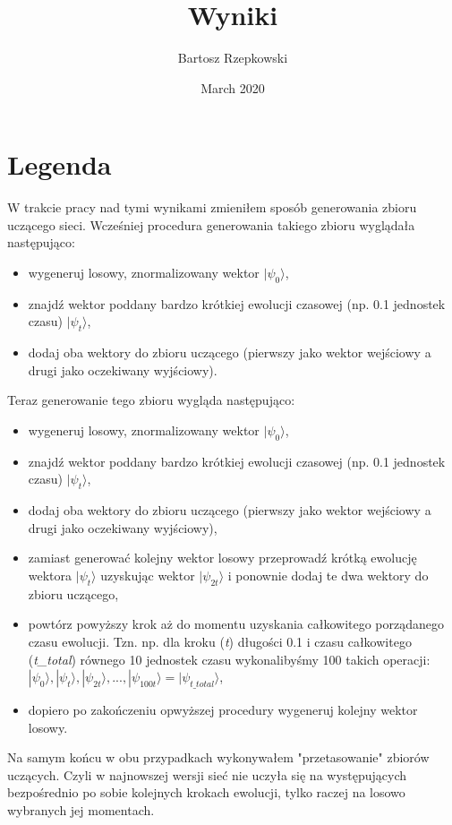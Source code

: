 \documentclass{article}
\title{Wyniki}
\author{Bartosz Rzepkowski}
\date{March 2020}
\begin{document}
\maketitle

\section*{Legenda}

W trakcie pracy nad tymi wynikami zmieniłem sposób generowania zbioru uczącego sieci. Wcześniej procedura generowania takiego zbioru wyglądała następująco:
\begin{itemize}
	\item wygeneruj losowy, znormalizowany wektor $|\psi_0\rangle$,
	\item znajdź wektor poddany bardzo krótkiej ewolucji czasowej (np. 0.1 jednostek czasu) $|\psi_t\rangle$,
	\item dodaj oba wektory do zbioru uczącego (pierwszy jako wektor wejściowy a drugi jako oczekiwany wyjściowy).
\end{itemize}

Teraz generowanie tego zbioru wygląda następująco:
\begin{itemize}
	\item wygeneruj losowy, znormalizowany wektor $|\psi_0\rangle$,
	\item znajdź wektor poddany bardzo krótkiej ewolucji czasowej (np. 0.1 jednostek czasu) $|\psi_t\rangle$,
	\item dodaj oba wektory do zbioru uczącego (pierwszy jako wektor wejściowy a drugi jako oczekiwany wyjściowy),
	\item zamiast generować kolejny wektor losowy przeprowadź krótką ewolucję wektora $|\psi_t\rangle$ uzyskując wektor $|\psi_{2t}\rangle$ i ponownie dodaj te dwa wektory do zbioru uczącego,
	\item powtórz powyższy krok aż do momentu uzyskania całkowitego porządanego czasu ewolucji. Tzn. np. dla kroku (\textit{t}) długości 0.1 i czasu całkowitego (\textit{t\_total}) równego 10 jednostek czasu wykonalibyśmy 100 takich operacji: 
	$|\psi_{0}\rangle, |\psi_{t}\rangle, |\psi_{2t}\rangle, ..., |\psi_{100t}\rangle = |\psi_{t\_total}\rangle$,
	\item dopiero po zakończeniu opwyższej procedury wygeneruj kolejny wektor losowy.
\end{itemize}

Na samym końcu w obu przypadkach wykonywałem "przetasowanie" zbiorów uczących. Czyli w najnowszej wersji sieć nie uczyła się na występujących bezpośrednio po sobie kolejnych krokach ewolucji, tylko raczej na losowo wybranych jej momentach.
\end{document}
